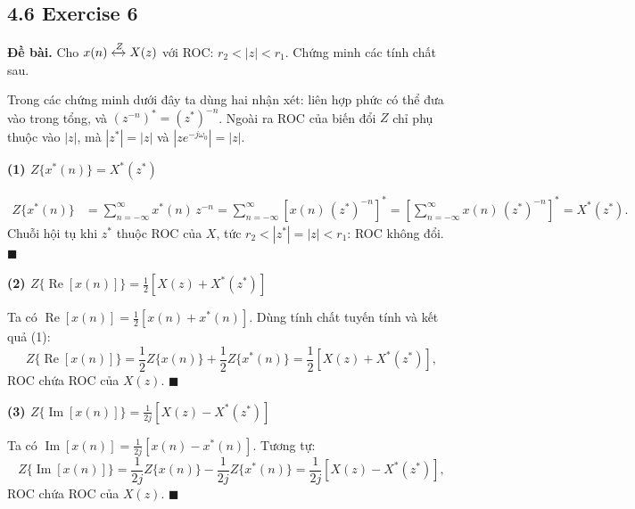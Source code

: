 \documentclass[12pt,a4paper]{article}
\begin{document}
\subsection*{4.6 Exercise 6}
\textbf{Đề bài.} Cho $x(n)\xleftrightarrow{Z} X(z)$ với ROC: $r_2 < |z| < r_1$. Chứng minh các tính chất sau.

\noindent Trong các chứng minh dưới đây ta dùng hai nhận xét: liên hợp phức có thể đưa vào trong tổng, và $\left(z^{-n}\right)^* = (z^*)^{-n}$. Ngoài ra ROC của biến đổi $Z$ chỉ phụ thuộc vào $|z|$, mà $|z^*| = |z|$ và $|ze^{-j\omega_0}| = |z|$.

\par\smallskip\noindent\textbf{(1) $Z\{x^*(n)\} = X^*(z^*)$}\par
\begin{align*}
Z\{x^*(n)\} &= \sum_{n=-\infty}^{\infty} x^*(n)\,z^{-n}
 = \sum_{n=-\infty}^{\infty} \left[x(n)\,(z^*)^{-n}\right]^*
 = \left[\sum_{n=-\infty}^{\infty} x(n)\,(z^*)^{-n}\right]^*
 = X^*(z^*).
\end{align*}
Chuỗi hội tụ khi $z^*$ thuộc ROC của $X$, tức $r_2 < |z^*| = |z| < r_1$: ROC không đổi. \hfill$\blacksquare$

\par\smallskip\noindent\textbf{(2) $Z\{\operatorname{Re}[x(n)]\} = \frac{1}{2}\left[X(z) + X^*(z^*)\right]$}\par
Ta có $\operatorname{Re}[x(n)] = \frac{1}{2}\left[x(n) + x^*(n)\right]$. Dùng tính chất tuyến tính và kết quả (1):
\[
Z\{\operatorname{Re}[x(n)]\} = \frac{1}{2}Z\{x(n)\} + \frac{1}{2}Z\{x^*(n)\} = \frac{1}{2}\left[X(z) + X^*(z^*)\right],
\]
ROC chứa ROC của $X(z)$. \hfill$\blacksquare$

\par\smallskip\noindent\textbf{(3) $Z\{\operatorname{Im}[x(n)]\} = \frac{1}{2j}\left[X(z) - X^*(z^*)\right]$}\par
Ta có $\operatorname{Im}[x(n)] = \frac{1}{2j}\left[x(n) - x^*(n)\right]$. Tương tự:
\[
Z\{\operatorname{Im}[x(n)]\} = \frac{1}{2j}Z\{x(n)\} - \frac{1}{2j}Z\{x^*(n)\} = \frac{1}{2j}\left[X(z) - X^*(z^*)\right],
\]
ROC chứa ROC của $X(z)$. \hfill$\blacksquare$
\end{document}
